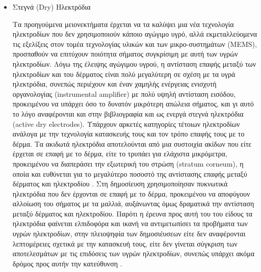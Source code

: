 \documentclass[11pt,a4paper,english,greek,twoside]{../Thesis}
\begin{document}
\begin{itemize}
    \item{Στεγνά (Dry) Ηλεκτρόδια}
    \par Τα προηγούμενα μειονεκτήματα έρχεται να τα καλύψει μια νέα τεχνολογία ηλεκτροδίων που δεν χρησιμοποιούν κάποιο αγώγιμο υγρό, αλλά εκμεταλλεύομενα τις εξελίξεις στον τομέα τεχνολογίας υλικών και των μικρο-συστημάτων (MEMS), προσπαθούν να επιτύχουν ποιότητα σήματος συγκρίσιμη με αυτή των υγρών ηλεκτροδίων. Λόγω της έλειψης αγώγιμου υγρού, η αντίσταση επαφής μεταξύ των ηλεκτροδίων και του δέρματος είναι πολύ μεγαλύτερη σε σχέση με τα υγρά ηλεκτρόδια, συνεπώς περιέχουν και έναν χαμηλής ενέργειας ενισχυτή οργανολογίας (instrumental amplifier) με πολύ υψηλή αντίσταση εισόδου, προκειμένου να υπάρχει όσο το δυνατόν μικρότερη απώλεια σήματος, και γι αυτό το λόγο αναφέρονται και στην βιβλιογραφία και ως ενεργά στεγνά ηλεκτρόδια (active dry electrodes). Υπάρχουν αρκετές κατηγορίες τέτοιων ηλεκτροδίων ανάλογα με την τεχνολογία κατασκευής τους και τον τρόπο επαφής τους με το δέρμα. Τα ακιδωτά ηλεκτρόδια αποτελούνται από μια συστοιχία ακίδων που είτε έρχεται σε επαφή με το δέρμα, είτε το τρυπάει για ελάχιστα μικρόμετρα, προκειμένου να διαπεράσει την εξωτερική του στρώση (stratum corneum), η οποία και ευθύνεται για το μεγαλύτερο ποσοστό της αντίστασης επαφής μεταξύ δέρματος και ηλεκτροδίου \cite{lopez2014dry}. Στη δημοσίευση \cite{sullivan2007low} χρησιμοποίησαν πυκνωτικά ηλεκτρόδια που δεν έρχονται σε επαφή με το δέρμα, προκειμένου να αποφύγουν αλλοίωση του σήματος με τα μαλλιά, αυξάνωντας όμως δραματικά την αντίσταση μεταξύ δέρματος και ηλεκτροδίου. Παρότι η έρευνα προς αυτή του του είδους τα ηλεκτρόδια φαίνεται ελπιδοφόρα και ικανή να αντιμετωπίσει τα προβήματα των υγρών ηλεκτροδίων, στην πλειοψηφία των δημοσιέυσεων είτε δεν αναφέρονται λεπτομέρειες σχετικά με την κατασκευή τους, είτε δεν γίνεται σύγκριση των αποτελεσμάτων με τις επιδόσεις των υγρών ηλεκτροδίων, συνεπώς υπάρχει ακόμα δρόμος προς αυτήν την κατεύθυνση \cite{lopez2014dry}.
    

\end{itemize}
\end{document}
